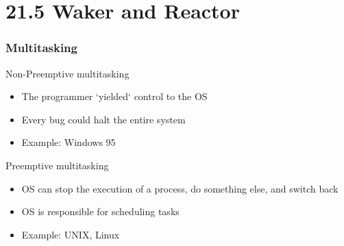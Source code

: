 \section{21.5 Waker and Reactor} %
\begin{frame}[fragile]
    \frametitle{Multitasking}
% 
% 
% 
% 
{\color{red}Non-Preemptive multitasking}
     \begin{itemize}
         \item The programmer `yielded` control to the OS
         \item Every bug could halt the entire system
         \item Example: Windows 95
     \end{itemize}
 
{\color{red}Preemptive multitasking}
     \begin{itemize}
         \item OS can stop the execution of a process, do something else, and switch back
         \item OS is responsible for scheduling tasks
         \item Example: UNIX, Linux
     \end{itemize}
% 
\end{frame}

